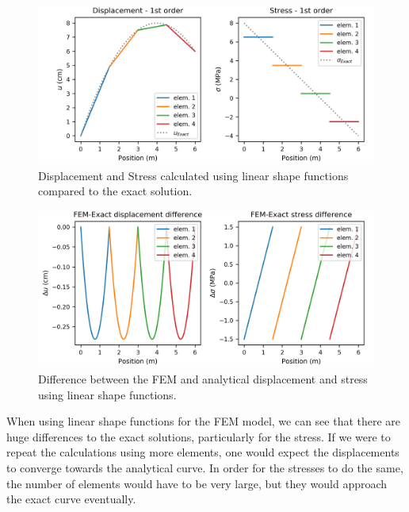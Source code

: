 \documentclass[12pt]{article}
\begin{document}
\section{}
\begin{figure}[h!]
	\centering
	\includegraphics[width=0.9\linewidth]{1st_order_plot.png}
	\captionsetup{format=hang}
	\caption{Displacement and Stress calculated using linear shape functions compared to the exact solution.}
	\label{fig:1plot}
\end{figure}
\begin{figure}[h!]
	\centering
	\includegraphics[width=0.9\linewidth]{1st_order_diffplot.png}
	\captionsetup{format=hang}
	\caption{Difference between the FEM and analytical displacement and stress using linear shape functions.}
	\label{fig:1diffplot}
\end{figure}
When using linear shape functions for the FEM model, we can see that there are huge differences to the exact solutions, particularly for the stress. If we were to repeat the calculations using more elements, one would expect the displacements to converge towards the analytical curve. In order for the stresses to do the same, the number of elements would have to be very large, but they would approach the exact curve eventually.
\newpage
\end{document}

